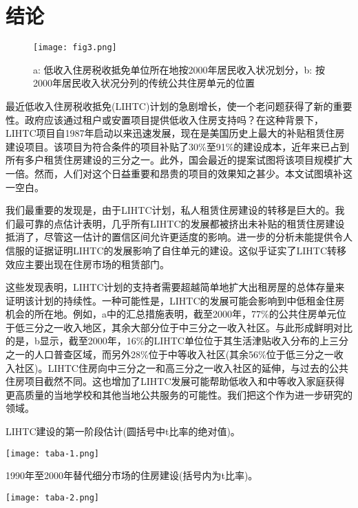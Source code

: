 \documentclass[lang=cn,11pt,a4paper]{paper}
\begin{document}
\section{结论}\label{sec6}

\begin{figure}[t]
	\centering
	\texttt{[image: fig3.png]}
  \caption{a: 低收入住房税收抵免单位所在地按2000年居民收入状况划分，b: 按2000年居民收入状况分列的传统公共住房单元的位置}\label{fig3}
\end{figure}

最近低收入住房税收抵免(LIHTC)计划的急剧增长，使一个老问题获得了新的重要性。政府应该通过租户或安置项目提供低收入住房支持吗？在这种背景下，LIHTC项目自1987年启动以来迅速发展，现在是美国历史上最大的补贴租赁住房建设项目。该项目为符合条件的项目补贴了30\%至91\%的建设成本，近年来已占到所有多户租赁住房建设的三分之一。此外，国会最近的提案试图将该项目规模扩大一倍。然而，人们对这个日益重要和昂贵的项目的效果知之甚少。本文试图填补这一空白。

我们最重要的发现是，由于LIHTC计划，私人租赁住房建设的转移是巨大的。我们最可靠的点估计表明，几乎所有LIHTC的发展都被挤出未补贴的租赁住房建设抵消了，尽管这一估计的置信区间允许更适度的影响。进一步的分析未能提供令人信服的证据证明LIHTC的发展影响了自住单元的建设。这似乎证实了LIHTC转移效应主要出现在住房市场的租赁部门。

这些发现表明，LIHTC计划的支持者需要超越简单地扩大出租房屋的总体存量来证明该计划的持续性。一种可能性是，LIHTC的发展可能会影响到中低租金住房机会的所在地。例如，a中的汇总措施表明，截至2000年，77\%的公共住房单元位于低三分之一收入地区，其余大部分位于中三分之一收入社区。与此形成鲜明对比的是，b显示，截至2000年，16\%的LIHTC单位位于其生活津贴收入分布的上三分之一的人口普查区域，而另外28\%位于中等收入社区(其余56\%位于低三分之一收入社区)。LIHTC住房向中三分之一和高三分之一收入社区的延伸，与过去的公共住房项目截然不同。这也增加了LIHTC发展可能帮助低收入和中等收入家庭获得更高质量的当地学校和其他当地公共服务的可能性。我们把这个作为进一步研究的领域。


\appendix

\begin{table}[h]
  \caption{LIHTC建设的第一阶段估计(圆括号中t比率的绝对值)。}\label{taba-1}
  \texttt{[image: taba-1.png]}
\noindent{}
\end{table}

\begin{table}[h]
  \caption{1990年至2000年替代细分市场的住房建设(括号内为t比率)。}\label{taba-2}
  \texttt{[image: taba-2.png]}
\end{table}


\end{document}
